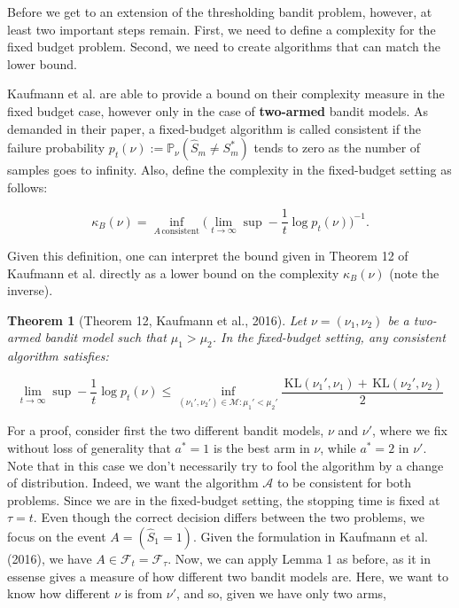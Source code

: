 \documentclass[12pt,]{article}
\newtheorem{theorem}{Theorem}
\newcommand{\KL}{\,\text{KL}}
\begin{document}
Before we get to an extension of the thresholding bandit problem,
however, at least two important steps remain. First, we need to define a
complexity for the fixed budget problem. Second, we need to create
algorithms that can match the lower bound.

Kaufmann et al. are able to provide a bound on their complexity measure
in the fixed budget case, however only in the case of \textbf{two-armed}
bandit models. As demanded in their paper, a fixed-budget algorithm is
called consistent if the failure probability
\(p_t(\nu) := \mathbb{P}_{\nu}(\hat{S}_m \neq S^*_m)\) tends to zero as
the number of samples goes to infinity. Also, define the complexity in
the fixed-budget setting as follows:

\begin{equation}
\kappa_B(\nu) = \inf_{A \, \text{consistent}} \big(\lim_{t \to \infty} \sup - \frac{1}{t} \log p_t(\nu)\big)^{-1}.
\end{equation}

Given this definition, one can interpret the bound given in Theorem 12
of Kaufmann et al. directly as a lower bound on the complexity
\(\kappa_B(\nu)\) (note the inverse).

\begin{theorem}[Theorem 12, Kaufmann et al., 2016] \label{theorem:KaufmannEtAlTheorem12}
Let $\nu = (\nu_1, \nu_2)$ be a two-armed bandit model such that $\mu_1 > \mu_2$. In the fixed-budget setting, any consistent algorithm satisfies:

\begin{equation*}
\lim_{t \to \infty} \sup - \frac{1}{t} \log p_t(\nu) \leq \inf_{(\nu_1', \nu_2') \in \mathcal{M}: \mu_1' < \mu_2'} \frac{\KL(\nu_1', \nu_1) + \KL(\nu_2', \nu_2)}{2}
\end{equation*}
\end{theorem}

For a proof, consider first the two different bandit models, \(\nu\) and
\(\nu'\), where we fix without loss of generality that \(a^* = 1\) is
the best arm in \(\nu\), while \(a^* = 2\) in \(\nu'\). Note that in
this case we don't necessarily try to fool the algorithm by a change of
distribution. Indeed, we want the algorithm \(\mathcal{A}\) to be
consistent for both problems. Since we are in the fixed-budget setting,
the stopping time is fixed at \(\tau = t\). Even though the correct
decision differs between the two problems, we focus on the event
\(A = (\hat{S}_1 = 1)\). Given the formulation in Kaufmann et al.
(2016), we have \(A \in \mathcal{F}_t = \mathcal{F}_{\tau}\). Now, we
can apply Lemma 1 as before, as it in essense gives a measure of how
different two bandit models are. Here, we want to know how different
\(\nu\) is from \(\nu'\), and so, given we have only two arms,
\end{document}
